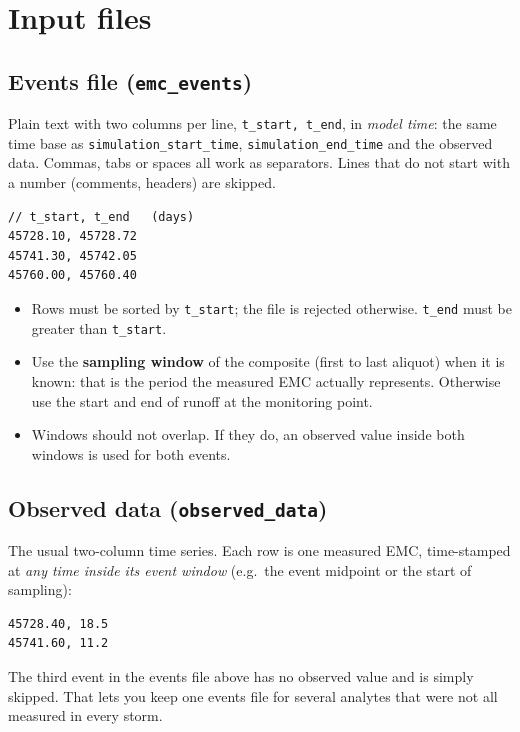 \documentclass[11pt,a4paper]{article}
\newcommand{\code}[1]{\texttt{\small #1}}
\begin{document}
\section{Input files}

\subsection{Events file (\code{emc\_events})}
Plain text with two columns per line, \code{t\_start, t\_end}, in \emph{model
time}: the same time base as \code{simulation\_start\_time},
\code{simulation\_end\_time} and the observed data. Commas, tabs or spaces all
work as separators. Lines that do not start with a number (comments, headers) are
skipped.
\begin{lstlisting}
// t_start, t_end   (days)
45728.10, 45728.72
45741.30, 45742.05
45760.00, 45760.40
\end{lstlisting}
\begin{itemize}[leftmargin=1.4em]
  \item Rows must be sorted by \code{t\_start}; the file is rejected otherwise.
        \code{t\_end} must be greater than \code{t\_start}.
  \item Use the \textbf{sampling window} of the composite (first to last
        aliquot) when it is known: that is the period the measured EMC actually
        represents. Otherwise use the start and end of runoff at the monitoring
        point.
  \item Windows should not overlap. If they do, an observed value inside both
        windows is used for both events.
\end{itemize}

\subsection{Observed data (\code{observed\_data})}
The usual two-column time series. Each row is one measured EMC, time-stamped at
\emph{any time inside its event window} (e.g.\ the event midpoint or the start of
sampling):
\begin{lstlisting}
45728.40, 18.5
45741.60, 11.2
\end{lstlisting}
The third event in the events file above has no observed value and is simply
skipped. That lets you keep one events file for several analytes that were not
all measured in every storm.
\end{document}

